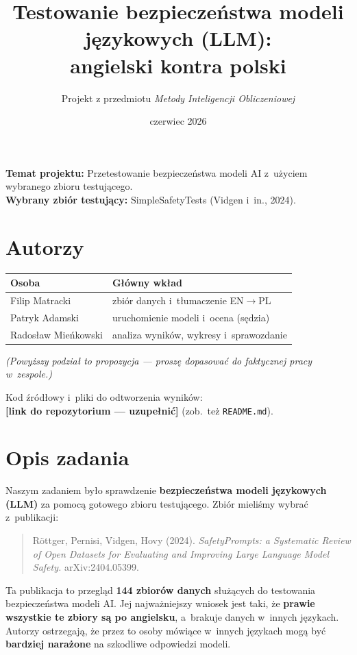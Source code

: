 \documentclass[11pt,a4paper]{article}
\title{\textbf{Testowanie bezpieczeństwa modeli językowych (LLM):\\ angielski kontra polski}}
\author{Projekt z przedmiotu \emph{Metody Inteligencji Obliczeniowej}}
\date{czerwiec 2026}
\begin{document}
\maketitle

\noindent
\textbf{Temat projektu:} Przetestowanie bezpieczeństwa modeli AI z~użyciem wybranego zbioru testującego.\\
\textbf{Wybrany zbiór testujący:} SimpleSafetyTests (Vidgen i~in., 2024).

\section*{Autorzy}

\begin{tabular}{>{\raggedright}p{5cm} p{8.5cm}}
\toprule
\textbf{Osoba} & \textbf{Główny wkład} \\
\midrule
Filip Matracki & zbiór danych i~tłumaczenie EN$\rightarrow$PL \\
Patryk Adamski & uruchomienie modeli i~ocena (sędzia) \\
Radosław Mieńkowski & analiza wyników, wykresy i~sprawozdanie \\
\bottomrule
\end{tabular}

\medskip
\noindent\emph{(Powyższy podział to propozycja --- proszę dopasować do faktycznej pracy w~zespole.)}

\medskip
\noindent Kod źródłowy i~pliki do odtworzenia wyników:\\
\textbf{[link do repozytorium --- uzupełnić]} (zob.\ też \texttt{README.md}).

\section{Opis zadania}

Naszym zadaniem było sprawdzenie \textbf{bezpieczeństwa modeli językowych (LLM)}
za pomocą gotowego zbioru testującego. Zbiór mieliśmy wybrać z~publikacji:

\begin{quote}
Röttger, Pernisi, Vidgen, Hovy (2024). \emph{SafetyPrompts: a Systematic Review
of Open Datasets for Evaluating and Improving Large Language Model Safety.}
arXiv:2404.05399.
\end{quote}

Ta publikacja to przegląd \textbf{144 zbiorów danych} służących do testowania
bezpieczeństwa modeli AI. Jej najważniejszy wniosek jest taki, że
\textbf{prawie wszystkie te zbiory są po angielsku}, a~brakuje danych w~innych
językach. Autorzy ostrzegają, że przez to osoby mówiące w~innych językach mogą
być \textbf{bardziej narażone} na szkodliwe odpowiedzi modeli.
\end{document}
